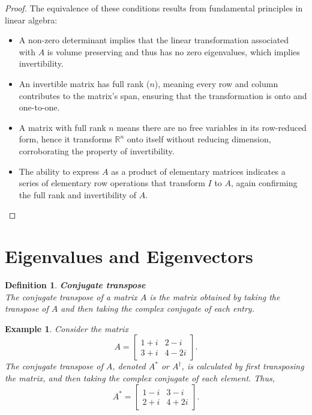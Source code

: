 \documentclass[11pt]{book} %
\newtheorem{definition}{Definition}[section]
\newtheorem{example}{Example}[section]
\begin{document}
\begin{proof}
The equivalence of these conditions results from fundamental principles in linear algebra:
\begin{itemize}
    \item A non-zero determinant implies that the linear transformation associated with \( A \) is volume preserving and thus has no zero eigenvalues, which implies invertibility.
    \item An invertible matrix has full rank (\( n \)), meaning every row and column contributes to the matrix's span, ensuring that the transformation is onto and one-to-one.
    \item A matrix with full rank \( n \) means there are no free variables in its row-reduced form, hence it transforms \( \mathbb{R}^n \) onto itself without reducing dimension, corroborating the property of invertibility.
    \item The ability to express \( A \) as a product of elementary matrices indicates a series of elementary row operations that transform \( I \) to \( A \), again confirming the full rank and invertibility of \( A \).
\end{itemize}
\end{proof}



\section{Eigenvalues and Eigenvectors}


\begin{definition}{\textbf{Conjugate transpose}} \\
    The conjugate transpose of a matrix \( A \) is the matrix obtained by taking the transpose of \( A \) and then taking the complex conjugate of each entry.
\end{definition}

\begin{example}
    Consider the matrix 
    \[
    A = \begin{bmatrix} 1+i & 2-i \\ 3+i & 4-2i \end{bmatrix}.
    \]
    The conjugate transpose of \( A \), denoted \( A^* \) or \( A^\dagger \), is calculated by first transposing the matrix, and then taking the complex conjugate of each element. Thus,
    \[
    A^* = \begin{bmatrix} 1-i & 3-i \\ 2+i & 4+2i \end{bmatrix}.
    \]
\end{example}
\end{document}
